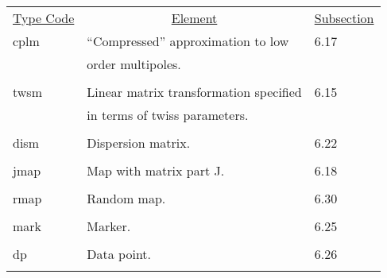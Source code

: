 \begin{center}
\begin{tabular}{lll}
\multicolumn{1}{c}{\underline{Type Code}} &
\multicolumn{1}{c}{\underline{Element}}   &
\multicolumn{1}{c}{\underline{Subsection}} \\
\hspace{1.5em}cplm    &         ``Compressed'' approximation to low   &\hspace{2em}6.17\\
               &         order multipoles.                    &\\
\vspace{-3mm}& &\\
\hspace{1.5em}twsm    &      Linear matrix transformation specified &  \hspace{2em}6.15\\
               &         in terms of twiss parameters.        &      \\
\vspace{-3mm}& &\\
\hspace{1.5em}dism    &         Dispersion matrix.                   &  \hspace{2em}6.22\\
\vspace{-3mm}& &\\
\hspace{1.5em}jmap    &         Map with matrix part J.              &  \hspace{2em}6.18\\
\vspace{-3mm}& &\\
\hspace{1.5em}rmap    &         Random map.              &  \hspace{2em}6.30\\
\vspace{-3mm}& &\\
\hspace{1.5em}mark    &         Marker.                              &  \hspace{2em}6.25\\
\vspace{-3mm}& &\\
\hspace{1.5em}dp      &         Data point.                          &  \hspace{2em}6.26\\
\vspace{-3mm}& &\\

\end{tabular}
\end{center}
